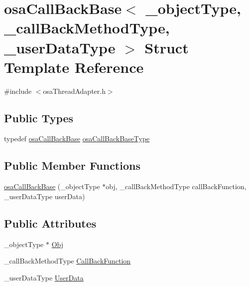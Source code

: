 \hypertarget{structosa_call_back_base}{}\section{osa\+Call\+Back\+Base$<$ \+\_\+object\+Type, \+\_\+call\+Back\+Method\+Type, \+\_\+user\+Data\+Type $>$ Struct Template Reference}
\label{structosa_call_back_base}


{\ttfamily \#include $<$osa\+Thread\+Adapter.\+h$>$}

\subsection*{Public Types}
\begin{DoxyCompactItemize}
\item 
typedef \hyperlink{structosa_call_back_base}{osa\+Call\+Back\+Base} \hyperlink{structosa_call_back_base_ac0992ce98eed821dbeae7d6b41bc6682}{osa\+Call\+Back\+Base\+Type}
\end{DoxyCompactItemize}
\subsection*{Public Member Functions}
\begin{DoxyCompactItemize}
\item 
\hyperlink{structosa_call_back_base_a84cca5d9c6af2fc46d9fb0e3012e6a79}{osa\+Call\+Back\+Base} (\+\_\+object\+Type $\ast$obj, \+\_\+call\+Back\+Method\+Type call\+Back\+Function, \+\_\+user\+Data\+Type user\+Data)
\end{DoxyCompactItemize}
\subsection*{Public Attributes}
\begin{DoxyCompactItemize}
\item 
\+\_\+object\+Type $\ast$ \hyperlink{structosa_call_back_base_a3ff953518bf08a840f22a4ff7e5b7c28}{Obj}
\item 
\+\_\+call\+Back\+Method\+Type \hyperlink{structosa_call_back_base_abfc6585f7501daad7cee19ab0b8a10eb}{Call\+Back\+Function}
\item 
\+\_\+user\+Data\+Type \hyperlink{structosa_call_back_base_a1178c4cd366dc6de8a939accf7099974}{User\+Data}
\end{DoxyCompactItemize}


